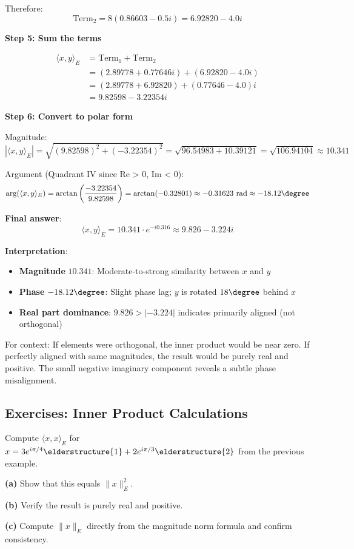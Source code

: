 \begin{example}
Therefore:
$$\text{Term}_2 = 8(0.86603 - 0.5i) = 6.92820 - 4.0i$$

\textbf{Step 5: Sum the terms}

\begin{align}
\langle x, y \rangle_E &= \text{Term}_1 + \text{Term}_2 \\
&= (2.89778 + 0.77646i) + (6.92820 - 4.0i) \\
&= (2.89778 + 6.92820) + (0.77646 - 4.0)i \\
&= 9.82598 - 3.22354i
\end{align}

\textbf{Step 6: Convert to polar form}

Magnitude:
$$|\langle x, y \rangle_E| = \sqrt{(9.82598)^2 + (-3.22354)^2} = \sqrt{96.54983 + 10.39121} = \sqrt{106.94104} \approx 10.341$$

Argument (Quadrant IV since Re > 0, Im < 0):
$$\arg(\langle x, y \rangle_E) = \arctan\left(\frac{-3.22354}{9.82598}\right) = \arctan(-0.32801) \approx -0.31623 \text{ rad} \approx -18.12\degree$$

\textbf{Final answer}:
$$\boxed{\langle x, y \rangle_E = 10.341 \cdot e^{-i0.316} \approx 9.826 - 3.224i}$$

\textbf{Interpretation}:

\begin{itemize}
\item \textbf{Magnitude} $10.341$: Moderate-to-strong similarity between $x$ and $y$
\item \textbf{Phase} $-18.12\degree$: Slight phase lag; $y$ is rotated $18\degree$ behind $x$
\item \textbf{Real part dominance}: $9.826 > |{-3.224}|$ indicates primarily aligned (not orthogonal)
\end{itemize}

For context: If elements were orthogonal, the inner product would be near zero. If perfectly aligned with same magnitudes, the result would be purely real and positive. The small negative imaginary component reveals a subtle phase misalignment.
\end{example}

\subsection{Exercises: Inner Product Calculations}

\begin{exercise}
Compute $\langle x, x \rangle_E$ for $x = 3e^{i\pi/4}\elderstructure{1} + 2e^{i\pi/3}\elderstructure{2}$ from the previous example.

\textbf{(a)} Show that this equals $\|x\|_E^2$.

\textbf{(b)} Verify the result is purely real and positive.

\textbf{(c)} Compute $\|x\|_E$ directly from the magnitude norm formula and confirm consistency.
\end{exercise}

